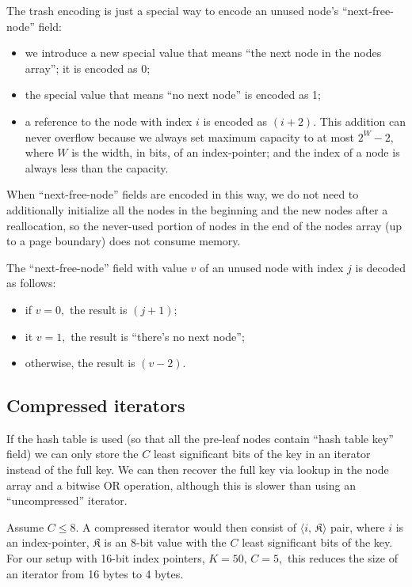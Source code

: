 \documentclass[a4paper,12pt]{article}
\begin{document}
The trash encoding is just a special way to encode an unused node's ``next-free-node'' field:
\begin{itemize}
    \item we introduce a new special value that means ``the next node in the nodes array''; it is encoded as 0;
    \item the special value that means ``no next node'' is encoded as 1;
    \item a reference to the node with index $i$ is encoded as $(i+2).$
        This addition can never overflow because we always set maximum capacity to at most $2^W - 2,$
        where $W$ is the width, in bits, of an index-pointer; and the index of a node is always less than the capacity.
\end{itemize}

When ``next-free-node'' fields are encoded in this way, we do not need to additionally initialize
all the nodes in the beginning and the new nodes after a reallocation,
so the never-used portion of nodes in the end of the nodes array (up to a page boundary) does not consume memory.

The ``next-free-node'' field with value $v$ of an unused node with index $j$ is decoded as follows:
\begin{itemize}
    \item if $v = 0,$ the result is $(j+1);$
    \item it $v = 1,$ the result is ``there's no next node'';
    \item otherwise, the result is $(v-2).$
\end{itemize}

\subsection{Compressed iterators}

If the hash table is used (so that all the pre-leaf nodes contain ``hash table key'' field)
we can only store the $C$ least significant bits of the key in an iterator instead of the full key.
We can then recover the full key via lookup in the node array and a bitwise OR operation, although this is slower than using an ``uncompressed'' iterator.

Assume $C \le 8.$
A compressed iterator would then consist of $\langle i, \, \mathfrak{K} \rangle$ pair, where $i$ is an index-pointer,
$\mathfrak{K}$ is an 8-bit value with the $C$ least significant bits of the key.
For our setup with 16-bit index pointers, $K = 50, \, C = 5,$ this reduces the size of an iterator from 16 bytes to 4 bytes.
\end{document}
